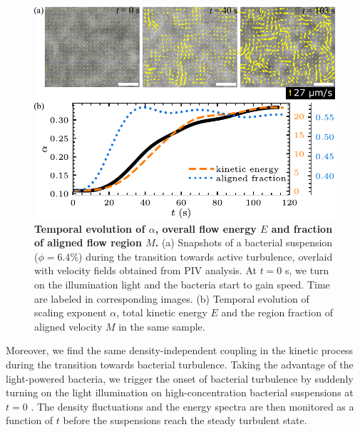 \begin{figure}[!]
\begin{center}
\includegraphics[width=5.5in]{figs/5-GNF/7.pdf}
\caption[Temporal evolution of $\alpha$, overall flow energy $E$ and fraction of aligned flow region $M$]
{
\textbf{Temporal evolution of $\alpha$, overall flow energy $E$ and fraction of aligned flow region $M$.}
(a) Snapshots of a bacterial suspension ($\phi=6.4\%$) during the transition towards active turbulence, overlaid with velocity fields obtained from PIV analysis. At $t=0$ s, we turn on the illumination light and the bacteria start to gain speed. Time are labeled in corresponding images.
(b) Temporal evolution of scaling exponent $\alpha$, total kinetic energy $E$ and the region fraction of aligned velocity $M$ in the same sample.
}
\label{fig:alpha-kinetics}
\end{center}
\end{figure}


Moreover, we find the same density-independent coupling in the kinetic process during the transition towards bacterial turbulence. Taking the advantage of the light-powered bacteria, we trigger the onset of bacterial turbulence by suddenly turning on the light illumination on high-concentration bacterial suspensions at $t=0$ \cite{Peng2020}. The density fluctuations and the energy spectra are then monitored as a function of $t$ before the suspensions reach the steady turbulent state.

